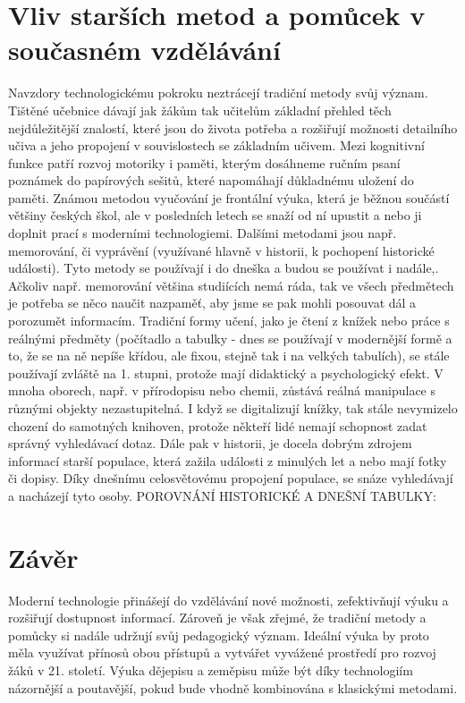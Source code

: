 \documentclass[a4paper,12pt,twoside,FP]{article}
\begin{document}
\section{Vliv starších metod a pomůcek v současném vzdělávání}
Navzdory technologickému pokroku neztrácejí tradiční metody svůj význam. Tištěné učebnice dávají jak žákům tak učitelům základní přehled těch nejdůležitější znalostí, které jsou do života potřeba a rozšiřují možnosti detailního učiva a jeho propojení v souvislostech se základním učivem. Mezi kognitivní funkce patří rozvoj motoriky i paměti, kterým dosáhneme ručním psaní poznámek do papírových sešitů, které napomáhají důkladnému uložení do paměti. Známou metodou vyučování je frontální výuka, která je běžnou součástí většiny českých škol, ale v posledních letech se snaží od ní upustit a nebo ji doplnit prací s moderními technologiemi. Dalšími metodami jsou např. memorování, či vyprávění (využívané hlavně v historii, k pochopení historické události). Tyto metody se používají i do dneška a budou se používat i nadále,. Ačkoliv např. memorování většina studiících nemá ráda, tak ve všech předmětech je potřeba se něco naučit nazpaměť, aby jsme se pak mohli posouvat dál a porozumět informacím. Tradiční formy učení, jako je čtení z knížek nebo práce s reálnými předměty (počítadlo a tabulky - dnes se používají v modernější formě a to, že se na ně nepíše křídou, ale fixou, stejně tak i na velkých tabulích), se stále používají zvláště na 1. stupni, protože mají didaktický a psychologický efekt.  V mnoha oborech, např. v přírodopisu nebo chemii, zůstává reálná manipulace s různými objekty nezastupitelná. I když se digitalizují knížky, tak stále nevymizelo chození do samotných knihoven, protože někteří lidé nemají schopnost zadat správný vyhledávací dotaz. Dále pak v historii, je docela dobrým zdrojem informací starší populace, která zažila události z minulých let a nebo mají fotky či dopisy. Díky dnešnímu celosvětovému propojení populace, se snáze vyhledávají a nacházejí tyto osoby.
POROVNÁNÍ HISTORICKÉ A DNEŠNÍ TABULKY:


\section{Závěr}
Moderní technologie přinášejí do vzdělávání nové možnosti, zefektivňují výuku a rozšiřují dostupnost informací. Zároveň je však zřejmé, že tradiční metody a pomůcky si nadále udržují svůj pedagogický význam. Ideální výuka by proto měla využívat přínosů obou přístupů a vytvářet vyvážené prostředí pro rozvoj žáků v 21. století. Výuka dějepisu a zeměpisu může být díky technologiím názornější a poutavější, pokud bude vhodně kombinována s klasickými metodami.


\clearpage
\printbibliography[title={Reference}]
\end{document}
